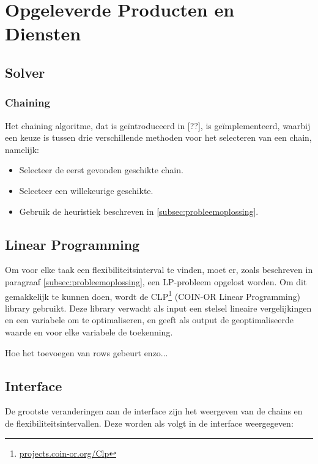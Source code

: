 \section{Opgeleverde Producten en Diensten}

\subsection{Solver}

\subsubsection*{Chaining}
Het chaining algoritme, dat is ge\"introduceerd in [??], is ge\"implementeerd, waarbij een keuze is tussen drie verschillende methoden voor het selecteren van een chain, namelijk:
\begin{itemize}
\item Selecteer de eerst gevonden geschikte chain.
\item Selecteer een willekeurige geschikte.
\item Gebruik de heuristiek beschreven in \ref{subsec:probleemoplossing}.
\end{itemize}

\subsection*{Linear Programming}
Om voor elke taak een flexibiliteitsinterval te vinden, moet er, zoals beschreven in paragraaf \ref{subsec:probleemoplossing}, een LP-probleem opgelost worden. Om dit gemakkelijk te kunnen doen, wordt de CLP\footnote{\href{https://projects.coin-or.org/Clp}{projects.coin-or.org/Clp}} (COIN-OR Linear Programming) library gebruikt. Deze library verwacht als input een stelsel lineaire vergelijkingen en een variabele om te optimaliseren, en geeft als output de geoptimaliseerde waarde en voor elke variabele de toekenning.

Hoe het toevoegen van rows gebeurt enzo...

\subsection{Interface}
De grootste veranderingen aan de interface zijn het weergeven van de chains en de flexibiliteitsintervallen. Deze worden als volgt in de interface weergegeven:

